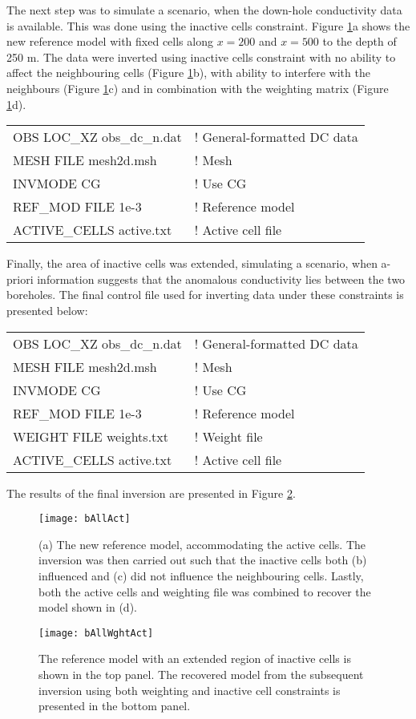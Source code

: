 The next step was to simulate a scenario, when the down-hole conductivity data is available. This was done using the inactive cells constraint. Figure \ref{fig:bAllAct}a shows the new reference model with fixed cells along $x=200$ and $x=500$ to the depth of 250 m. The data were inverted using inactive cells constraint with no ability to affect the neighbouring cells (Figure \ref{fig:bAllAct}b), with ability to interfere with the neighbours (Figure \ref{fig:bAllAct}c) and in combination with the weighting matrix (Figure \ref{fig:bAllAct}d).
%
\begin{fileExample}
\begin{tabular}{|ll|}
\hline
OBS LOC\_XZ obs\_dc\_n.dat & ! General-formatted DC data \\
MESH FILE mesh2d.msh & ! Mesh \\
INVMODE CG & ! Use CG \\
REF\_MOD FILE 1e-3 & ! Reference model \\
ACTIVE\_CELLS active.txt & ! Active cell file \\
\hline
\end{tabular}
\end{fileExample}
%
Finally, the area of inactive cells was extended, simulating a scenario, when a-priori information suggests that the anomalous conductivity lies between the two boreholes. The final control file used for inverting data under these constraints is presented below:
%
\begin{fileExample}
\begin{tabular}{|ll|}
\hline
OBS LOC\_XZ obs\_dc\_n.dat & ! General-formatted DC data \\
MESH FILE mesh2d.msh & ! Mesh \\
INVMODE CG & ! Use CG \\
REF\_MOD FILE 1e-3 & ! Reference model \\
WEIGHT FILE weights.txt & ! Weight file \\
ACTIVE\_CELLS active.txt & ! Active cell file \\
\hline
\end{tabular}
\end{fileExample}
%
The results of the final inversion are presented in Figure \ref{fig:bAllWghtAct}.

%
\begin{figure}
\centering
\texttt{[image: bAllAct]}
\caption{(a) The new reference model, accommodating the active cells. The inversion was then carried out such that the inactive cells both (b) influenced and (c) did not influence the neighbouring cells. Lastly, both the active cells and weighting file was combined to recover the model shown in (d).}
\label{fig:bAllAct}
\end{figure}
%
\begin{figure}
\centering
\texttt{[image: bAllWghtAct]}
\caption{The reference model with an extended region of inactive cells is shown in the top panel. The recovered model from the subsequent inversion using both weighting and inactive cell constraints is presented in the bottom panel.}
\label{fig:bAllWghtAct}
\end{figure}